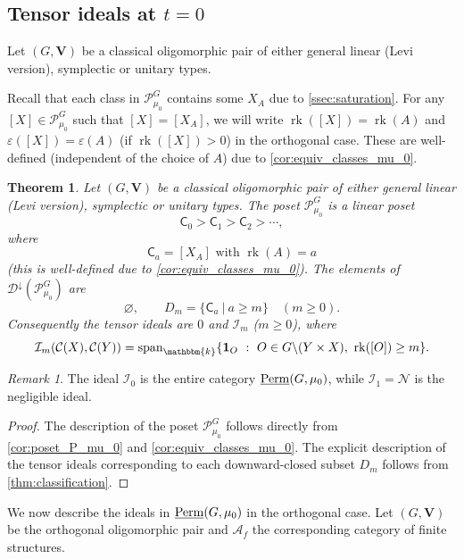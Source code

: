 \documentclass[11pt,a4paper]{amsart}
\theoremstyle{plain}%
\newtheorem{theorem}[lemma]{Theorem}
\theoremstyle{definition}
\theoremstyle{remark}
\newtheorem{remark}[lemma]{Remark}
\newcommand{\eps}{\varepsilon}
\newcommand{\Span}{\mathrm{span}}
\newcommand{\rk}{{\operatorname{rk}}}
\newcommand{\V}{\mathbf{V}}
\newcommand{\Perm}{\underline{{\rm Perm}}}
\newcommand{\kk}{\mathbbm{k}}
\newcommand{\one}{{\mathbf{1}}}
\newcommand{\Down}{\mathcal{D}^{\downarrow}}
\newcommand{\N}{\mathcal N}
\begin{document}
\subsection{Tensor ideals at \texorpdfstring{$t=0$}{t=0}}\label{sec:ideals_at_zero}



Let $(G, \V)$ be a classical oligomorphic pair of either general linear (Levi version), symplectic or unitary types. 

Recall that each class in $\mathcal{P}_{\mu_0}^G$ contains some $X_A$ due to \cref{ssec:saturation}.  
For any $[X]\in \mathcal{P}_{\mu_0}^G$ such that $[X]=[X_A]$, we will write $\rk([X])=\rk(A)$ and $\eps([X])=\eps(A)$ (if $\rk([X])>0$) in the orthogonal case. These are well-defined (independent of the choice of $A$) due to \cref{cor:equiv_classes_mu_0}.

\begin{theorem}\label{thm:zero-chain}
Let $(G, \V)$ be a classical oligomorphic pair of either general linear (Levi version), symplectic or unitary types. The poset $\mathcal{P}_{\mu_0}^G$ is a linear poset
\[
 \mathsf C_0>\mathsf C_1>\mathsf C_2>\cdots,
\]
where
\[
 \mathsf C_a=[X_A] \text{ with } \rk(A)=a
\] (this is well-defined due to \cref{cor:equiv_classes_mu_0}).
The elements of $\Down(\mathcal{P}_{{\mu_0}}^G)$ are
\[
 \varnothing,\qquad D_m=\{\mathsf C_a \ | \ a\geq m\}\quad(m\geq0).
\]
Consequently the tensor ideals are $0$ and $\mathcal I_m$ ($m\geq0$), where 
\[
 \mathcal I_m(\mathcal{C}(X),\mathcal{C}(Y))
 =\Span_\kk\{\one_O \ : \ O\in G\backslash (Y\times X) , ~  \rk([O])\geq m\}.
\]
\end{theorem}
\begin{remark}
    The ideal $\mathcal I_0$ is the entire category $\Perm(G, \mu_0)$, while $\mathcal I_1=\N$ is the negligible ideal.
\end{remark}

\begin{proof}
The description of the poset $\mathcal{P}_{{\mu_0}}^G$ follows directly from \cref{cor:poset_P_mu_0} and \cref{cor:equiv_classes_mu_0}. The explicit description of the tensor ideals corresponding to each downward-closed subset $D_m$ follows from \cref{thm:classification}.


\end{proof}


We now describe the ideals in $\Perm(G, \mu_0)$ in the orthogonal case. Let $(G, \V)$ be the orthogonal oligomorphic pair and $\mathcal{A}_f$ the corresponding category of finite structures. %
\end{document}
